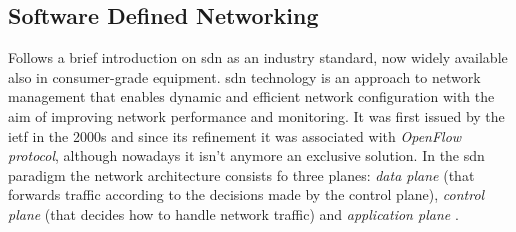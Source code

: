 
\subsection{Software Defined Networking}
\label{subsec:sdn}

Follows a brief introduction on \gls{sdn} as an industry standard, now widely available also in consumer-grade equipment. \gls{sdn} technology is an approach to network management that enables dynamic and efficient network configuration with the aim of improving network performance and monitoring. It was first issued by the \gls{ietf} in the 2000s and since its refinement it was associated with \textit{OpenFlow protocol}, although nowadays it isn't anymore an exclusive solution. In the \gls{sdn} paradigm the network architecture consists fo three planes: \textit{data plane} (that forwards traffic according to the decisions made by the control plane), \textit{control plane} (that decides how to handle network traffic) and \textit{application plane} \cite{Kreutz2015}.

